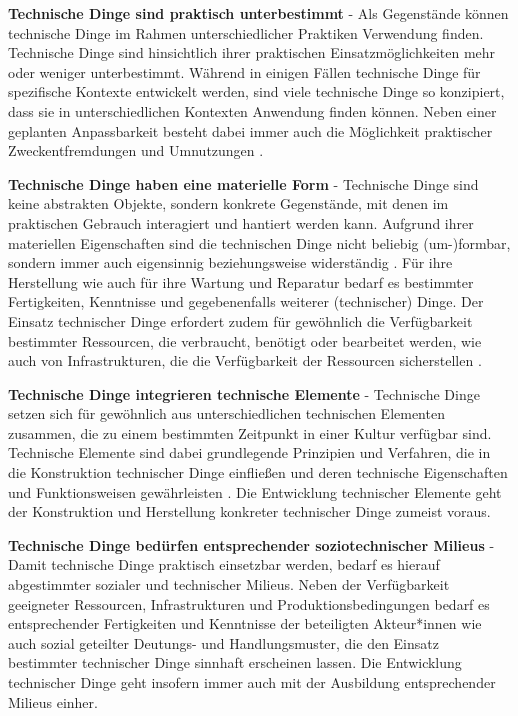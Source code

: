 \documentclass[
  a4paper,
]{book}
\begin{document}
\textbf{Technische Dinge sind praktisch unterbestimmt} - Als Gegenstände können technische Dinge im Rahmen unterschiedlicher Praktiken Verwendung finden. Technische Dinge sind hinsichtlich ihrer praktischen Einsatzmöglichkeiten mehr oder weniger unterbestimmt. Während in einigen Fällen technische Dinge für spezifische Kontexte entwickelt werden, sind viele technische Dinge so konzipiert, dass sie in unterschiedlichen Kontexten Anwendung finden können. Neben einer geplanten Anpassbarkeit besteht dabei immer auch die Möglichkeit praktischer Zweckentfremdungen und Umnutzungen \citep{brandesNonIntentionalDesign2006, houkesOntologyArtefactsHard2006}.

\textbf{Technische Dinge haben eine materielle Form} - Technische Dinge sind keine abstrakten Objekte, sondern konkrete Gegenstände, mit denen im praktischen Gebrauch interagiert und hantiert werden kann. Aufgrund ihrer materiellen Eigenschaften sind die technischen Dinge nicht beliebig (um-)formbar, sondern immer auch eigensinnig beziehungsweise widerständig \citep{houkesOntologyArtefactsHard2006, kalthoffEinleitungMaterialitatKultur2016}. Für ihre Herstellung wie auch für ihre Wartung und Reparatur bedarf es bestimmter Fertigkeiten, Kenntnisse und gegebenenfalls weiterer (technischer) Dinge. Der Einsatz technischer Dinge erfordert zudem für gewöhnlich die Verfügbarkeit bestimmter Ressourcen, die verbraucht, benötigt oder bearbeitet werden, wie auch von Infrastrukturen, die die Verfügbarkeit der Ressourcen sicherstellen \citep{shoveMattersPractice2017}.

\textbf{Technische Dinge integrieren technische Elemente} - Technische Dinge setzen sich für gewöhnlich aus unterschiedlichen technischen Elementen zusammen, die zu einem bestimmten Zeitpunkt in einer Kultur verfügbar sind. Technische Elemente sind dabei grundlegende Prinzipien und Verfahren, die in die Konstruktion technischer Dinge einfließen und deren technische Eigenschaften und Funktionsweisen gewährleisten \citep{simondonExistenzweiseTechnischerObjekte2012}. Die Entwicklung technischer Elemente geht der Konstruktion und Herstellung konkreter technischer Dinge zumeist voraus.

\textbf{Technische Dinge bedürfen entsprechender soziotechnischer Milieus} - Damit technische Dinge praktisch einsetzbar werden, bedarf es hierauf abgestimmter sozialer und technischer Milieus. Neben der Verfügbarkeit geeigneter Ressourcen, Infrastrukturen und Produktionsbedingungen bedarf es entsprechender Fertigkeiten und Kenntnisse der beteiligten Akteur*innen wie auch sozial geteilter Deutungs- und Handlungsmuster, die den Einsatz bestimmter technischer Dinge sinnhaft erscheinen lassen. Die Entwicklung technischer Dinge geht insofern immer auch mit der Ausbildung entsprechender Milieus einher.
\end{document}
